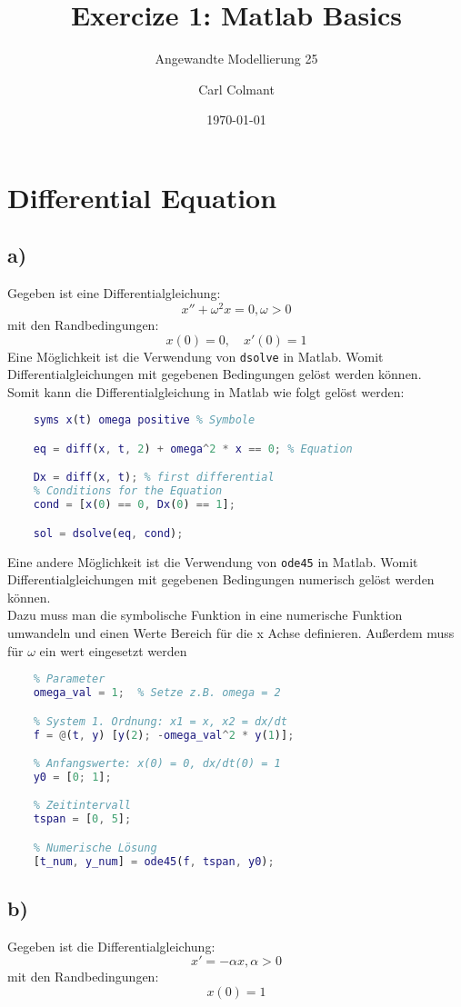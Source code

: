 \documentclass{scrartcl}
\title{Exercize 1: Matlab Basics}
\subtitle{Angewandte Modellierung 25}
\author{Carl Colmant}
\date{\today}
\begin{document}
\maketitle
\section*{Differential Equation}

\subsection*{a)}
Gegeben ist eine Differentialgleichung:
\begin{equation*}
    x''+\omega^2x=0 , \omega>0
\end{equation*}
mit den Randbedingungen:
\begin{equation*}
    x(0)=0,\quad x'(0)=1
\end{equation*}
Eine Möglichkeit ist die Verwendung von \texttt{dsolve} in Matlab. Womit Differentialgleichungen mit gegebenen Bedingungen gelöst werden können.\\
Somit kann die Differentialgleichung in Matlab wie folgt gelöst werden:
\begin{lstlisting}[language=Matlab, caption=Symbolic Math]
    %Symbolic Math:
    syms x(t) omega positive % Symbole

    eq = diff(x, t, 2) + omega^2 * x == 0; % Equation

    Dx = diff(x, t); % first differential
    % Conditions for the Equation
    cond = [x(0) == 0, Dx(0) == 1]; 

    sol = dsolve(eq, cond);
\end{lstlisting}

Eine andere Möglichkeit ist die Verwendung von \texttt{ode45} in Matlab. Womit Differentialgleichungen mit gegebenen Bedingungen numerisch gelöst werden können.\\
Dazu muss man die symbolische Funktion in eine numerische Funktion umwandeln und einen Werte Bereich für die x Achse definieren. Außerdem muss für $\omega$ ein wert eingesetzt werden \\
\begin{lstlisting}[language=Matlab, caption=Numeric Math]
    % numeric Math:
    % Parameter
    omega_val = 1;  % Setze z.B. omega = 2

    % System 1. Ordnung: x1 = x, x2 = dx/dt
    f = @(t, y) [y(2); -omega_val^2 * y(1)];

    % Anfangswerte: x(0) = 0, dx/dt(0) = 1
    y0 = [0; 1];

    % Zeitintervall
    tspan = [0, 5];

    % Numerische Lösung
    [t_num, y_num] = ode45(f, tspan, y0);
    \end{lstlisting}

\subsection*{b)}
Gegeben ist die Differentialgleichung:
\begin{equation*}
    x'=-\alpha x,  \alpha>0
\end{equation*}
mit den Randbedingungen:
\begin{equation*}
    x(0)=1
\end{equation*}
\end{document}
